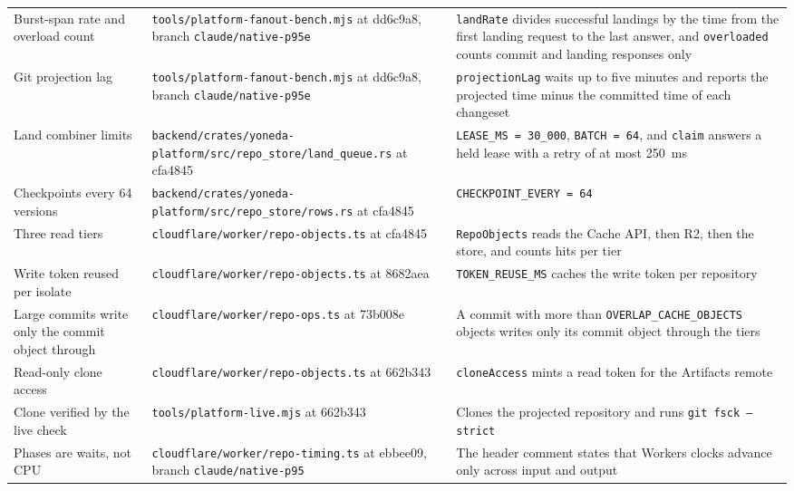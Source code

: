 \documentclass[11pt,letterpaper]{article}
\theoremstyle{definition}
\theoremstyle{remark}
\begin{document}
{\begin{longtable}{@{}L{3.0cm}L{5.3cm}L{7.2cm}@{}}
Burst-span rate and overload count & \nolinkurl{tools/platform-fanout-bench.mjs} \newline at dd6c9a8, branch \nolinkurl{claude/native-p95e} & \texttt{landRate} divides successful landings by the time from the first landing request to the last answer, and \texttt{overloaded} counts commit and landing responses only \\
Git projection lag & \nolinkurl{tools/platform-fanout-bench.mjs} \newline at dd6c9a8, branch \nolinkurl{claude/native-p95e} & \texttt{projectionLag} waits up to five minutes and reports the projected time minus the committed time of each changeset \\
Land combiner limits & \nolinkurl{backend/crates/yoneda-platform/src/repo_store/land_queue.rs} \newline at cfa4845 & \texttt{LEASE\_MS = 30\_000}, \texttt{BATCH = 64}, and \texttt{claim} answers a held lease with a retry of at most 250~ms \\
Checkpoints every 64 versions & \nolinkurl{backend/crates/yoneda-platform/src/repo_store/rows.rs} \newline at cfa4845 & \texttt{CHECKPOINT\_EVERY = 64} \\
Three read tiers & \nolinkurl{cloudflare/worker/repo-objects.ts} \newline at cfa4845 & \texttt{RepoObjects} reads the Cache API, then R2, then the store, and counts hits per tier \\
Write token reused per isolate & \nolinkurl{cloudflare/worker/repo-objects.ts} \newline at 8682aea & \texttt{TOKEN\_REUSE\_MS} caches the write token per repository \\
Large commits write only the commit object through & \nolinkurl{cloudflare/worker/repo-ops.ts} \newline at 73b008e & A commit with more than \texttt{OVERLAP\_CACHE\_OBJECTS} objects writes only its commit object through the tiers \\
Read-only clone access & \nolinkurl{cloudflare/worker/repo-objects.ts} \newline at 662b343 & \texttt{cloneAccess} mints a read token for the Artifacts remote \\
Clone verified by the live check & \nolinkurl{tools/platform-live.mjs} \newline at 662b343 & Clones the projected repository and runs \texttt{git fsck --strict} \\
Phases are waits, not CPU & \nolinkurl{cloudflare/worker/repo-timing.ts} \newline at ebbee09, branch \nolinkurl{claude/native-p95} & The header comment states that Workers clocks advance only across input and output \\

\end{longtable}}
\end{document}
